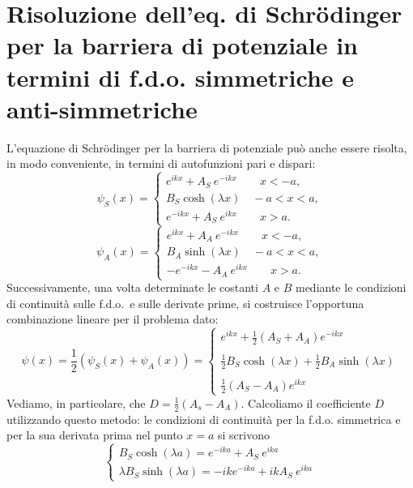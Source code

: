 \section{Risoluzione dell'eq. di Schr\"{o}dinger per la barriera di potenziale in termini di f.d.o. simmetriche e anti-simmetriche}
L'equazione di Schr\"{o}dinger per la barriera di potenziale può anche essere risolta, in modo conveniente, in termini di autofunzioni pari e dispari:
	\begin{equation}
		\psi _S (x) =
		\begin{cases}
		\displaystyle{e^{ikx} + A_S\ e^{-ikx} \qquad x<-a,}\\
		B_S \cosh (\lambda x) \quad -a<x<a,\\
		\displaystyle{e^{-ikx} + A_S\ e^{ikx} \qquad x>a.}
		\end{cases}
	\end{equation}
	\begin{equation}
		\psi _A (x) =
		\begin{cases}
		\displaystyle{e^{ikx} + A_A\ e^{-ikx} \qquad x<-a,}\\
		B_A \sinh (\lambda x) \quad -a<x<a,\\
		\displaystyle{-e^{-ikx} - A_A\ e^{ikx} \qquad x>a.}
		\end{cases}
	\end{equation}
Successivamente, una volta determinate le costanti $A$ e $B$ mediante le condizioni di continuità sulle f.d.o.~e sulle derivate prime, si costruisce l'opportuna combinazione lineare per il problema dato:
	\begin{equation}
		\psi (x) =\frac{1}{2}\left(\psi _S (x) + \psi _A (x) \right) =
		\begin{cases}
		\displaystyle{e^{ikx} + \frac{1}{2}\left(A_S+A_A\right) e^{-ikx}} \\
		\\
		\displaystyle{\frac{1}{2}B_S \cosh (\lambda x )+ \frac{1}{2} B_A \sinh (\lambda x)} \\
		\\
		\displaystyle{\frac{1}{2}\left(A_S - A_A \right) e^{ikx}}
		\end{cases}
	\end{equation}
Vediamo, in particolare, che $\displaystyle{D=\frac{1}{2}\left( A_s - A_A \right)}$. Calcoliamo il coefficiente $D$ utilizzando questo metodo: le condizioni di continuità per la f.d.o. simmetrica e per la sua derivata prima nel punto $x=a$ si scrivono
	\begin{equation}
		\begin{cases}
		\displaystyle{B_S \cosh (\lambda a) = e^{-ika}+ A_S\ e^{ika}}\\
		\displaystyle{\lambda B_S \sinh (\lambda a) = -ik e^{-ika}+ ikA_S\ e^{ika}}
		\end{cases}
	\label{eq:cap10_6}
	\end{equation}
